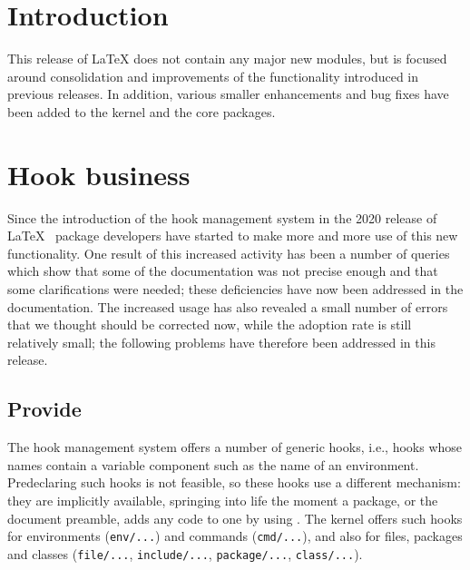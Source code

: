 \documentclass{ltnews}
\providecommand\tubcommand[1]{}
\begin{document}
\tubcommand{\addtolength\textheight{4.2pc}}   %

\maketitle
{ \spaceskip=3.33pt  \tableofcontents}

\setlength{}


\medskip


\section{Introduction}


This release of \LaTeX{} does not contain any major new modules, but
is focused around consolidation and improvements of the functionality
introduced in previous releases.  In addition, various smaller
enhancements and bug fixes have been added to the kernel and the core
packages.


\section{Hook business}

Since the introduction of the hook management system in the 2020
release of \LaTeX{}~\cite{34:ltnews32} package 
developers have started
to make more and more use of this new functionality. One result 
of this increased activity has been a
number of queries which show that some of the documentation was not
precise enough and that some clarifications were needed; these 
deficiencies have now been addressed in the documentation. 
%
The increased usage has also revealed 
a small number of 
errors that we thought
should be corrected now, while the adoption rate is still relatively
small; the following problems have therefore been addressed in this release.


\subsection{Provide }

The hook management system offers a number of generic hooks, i.e.,
hooks whose names contain a variable component such as the name
of an environment. Predeclaring such hooks is not feasible, 
so these hooks use a different mechanism: they are
implicitly available, springing into life the moment a package, or 
the document preamble, adds any code to one by using .  
%
The kernel offers such hooks for environments
 (\texttt{env/...}) and commands (\texttt{cmd/...}), and also for files, 
 packages and classes (\texttt{file/...},
\texttt{include/...}, \texttt{package/...}, \texttt{class/...}).
\end{document}
